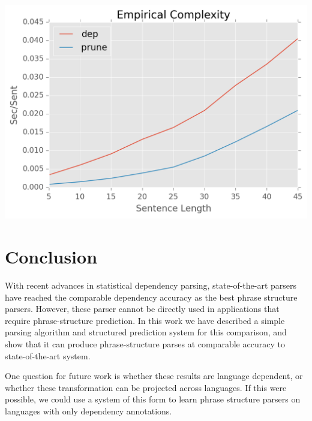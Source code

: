 \documentclass[11pt,letterpaper]{article}
\begin{document}
\begin{table}
  \centering

  \includegraphics[scale=0.4]{../notebooks/comp}
  \label{tab:speed}
  \caption{Experiments of parsing speed. (a) The speed of the parser on its own and with pruning. (b) The end-to-end speed of the parser when combined with different dependency parsers. }
\end{table}




\section{Conclusion}

With recent advances in statistical dependency parsing, state-of-the-art parsers
have reached the comparable  dependency accuracy as the best phrase structure parsers. However,
these parser cannot be directly used in applications that require phrase-structure prediction. In this work
we have described a simple parsing algorithm and structured prediction system for this comparison, and show that it
can produce phrase-structure parses at comparable accuracy to state-of-the-art system.

One question for future work is whether these results are language
dependent, or whether these transformation can be projected across
languages. If this were possible, we could use a system of this form to learn phrase
structure parsers on languages with only dependency annotations.
\end{document}
